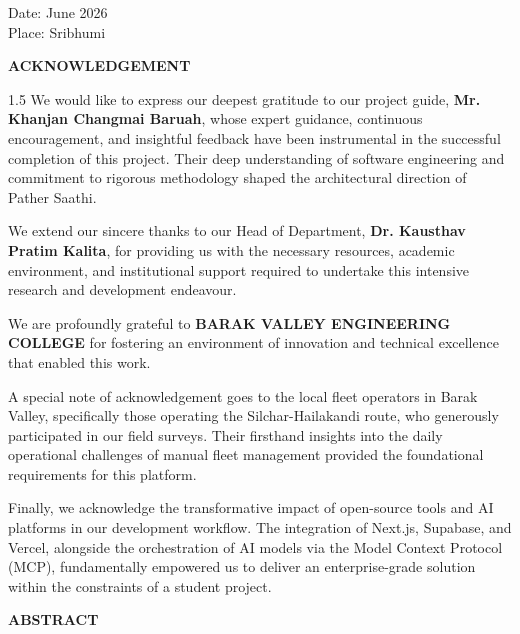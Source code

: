\vspace{1.5cm}
\noindent Date: June 2026\\
Place: Sribhumi

\newpage
\thispagestyle{empty}
\begin{center}
    {\Huge \textbf{ACKNOWLEDGEMENT}}\par
    \vspace{1.5cm}
\end{center}

\begin{spacing}{1.5}
We would like to express our deepest gratitude to our project guide, \textbf{Mr. Khanjan Changmai Baruah}, whose expert guidance, continuous encouragement, and insightful feedback have been instrumental in the successful completion of this project. Their deep understanding of software engineering and commitment to rigorous methodology shaped the architectural direction of Pather Saathi.

We extend our sincere thanks to our Head of Department, \textbf{Dr. Kausthav Pratim Kalita}, for providing us with the necessary resources, academic environment, and institutional support required to undertake this intensive research and development endeavour.

We are profoundly grateful to \textbf{BARAK VALLEY ENGINEERING COLLEGE} for fostering an environment of innovation and technical excellence that enabled this work.

A special note of acknowledgement goes to the local fleet operators in Barak Valley, specifically those operating the Silchar-Hailakandi route, who generously participated in our field surveys. Their firsthand insights into the daily operational challenges of manual fleet management provided the foundational requirements for this platform.

Finally, we acknowledge the transformative impact of open-source tools and AI platforms in our development workflow. The integration of Next.js, Supabase, and Vercel, alongside the orchestration of AI models via the Model Context Protocol (MCP), fundamentally empowered us to deliver an enterprise-grade solution within the constraints of a student project.
\end{spacing}

\newpage
\thispagestyle{empty}
\begin{center}
    {\Huge \textbf{ABSTRACT}}\par
    \vspace{1.5cm}
\end{center}

